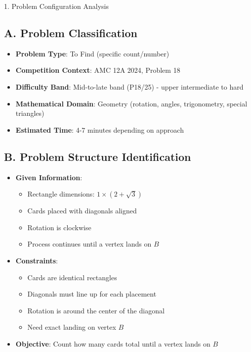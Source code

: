 \documentclass[12pt]{article}
\begin{document}
\begin{configbox}{1. Problem Configuration Analysis}

\subsection*{A. Problem Classification}
\begin{itemize}[leftmargin=*]
    \item \textbf{Problem Type}: To Find (specific count/number)
    \item \textbf{Competition Context}: AMC 12A 2024, Problem 18
    \item \textbf{Difficulty Band}: Mid-to-late band (P18/25) - upper intermediate to hard
    \item \textbf{Mathematical Domain}: Geometry (rotation, angles, trigonometry, special triangles)
    \item \textbf{Estimated Time}: 4-7 minutes depending on approach
\end{itemize}

\subsection*{B. Problem Structure Identification}
\begin{itemize}[leftmargin=*]
    \item \textbf{Given Information}: 
    \begin{itemize}
        \item Rectangle dimensions: $1 \times (2+\sqrt{3})$
        \item Cards placed with diagonals aligned
        \item Rotation is clockwise
        \item Process continues until a vertex lands on $B$
    \end{itemize}
    
    \item \textbf{Constraints}: 
    \begin{itemize}
        \item Cards are identical rectangles
        \item Diagonals must line up for each placement
        \item Rotation is around the center of the diagonal
        \item Need exact landing on vertex $B$
    \end{itemize}
    
    \item \textbf{Objective}: Count how many cards total until a vertex lands on $B$
    

\end{itemize}
\end{configbox}
\end{document}
